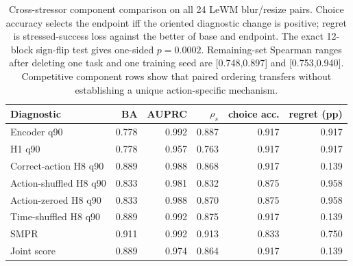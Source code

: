 \begin{table}[H]
\centering
\caption{Cross-stressor component comparison on all 24 LeWM blur/resize pairs. Choice accuracy selects the endpoint iff the oriented diagnostic change is positive; regret is stressed-success loss against the better of base and endpoint. The exact 12-block sign-flip test gives one-sided $p=0.0002$. Remaining-set Spearman ranges after deleting one task and one training seed are [0.748,0.897] and [0.753,0.940]. Competitive component rows show that paired ordering transfers without establishing a unique action-specific mechanism.}
\label{tab:cross-stressor-robustness-audit}
\footnotesize
\setlength{\tabcolsep}{3pt}
\begin{tabular}{lrrrrr}
\toprule
Diagnostic & BA & AUPRC & $\rho_s$ & choice acc. & regret (pp) \\
\midrule
Encoder q90 & 0.778 & 0.992 & 0.887 & 0.917 & 0.917 \\
H1 q90 & 0.778 & 0.957 & 0.763 & 0.917 & 0.917 \\
Correct-action H8 q90 & 0.889 & 0.988 & 0.868 & 0.917 & 0.139 \\
Action-shuffled H8 q90 & 0.833 & 0.981 & 0.832 & 0.875 & 0.958 \\
Action-zeroed H8 q90 & 0.833 & 0.988 & 0.870 & 0.875 & 0.958 \\
Time-shuffled H8 q90 & 0.889 & 0.992 & 0.875 & 0.917 & 0.139 \\
SMPR & 0.911 & 0.992 & 0.913 & 0.833 & 0.750 \\
Joint score & 0.889 & 0.974 & 0.864 & 0.917 & 0.139 \\
\bottomrule
\end{tabular}
\end{table}
